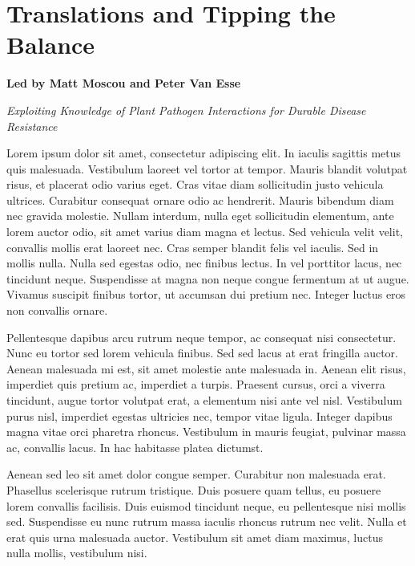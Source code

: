 \documentclass[12pt,]{book}
\theoremstyle{definition}
\theoremstyle{definition}
\theoremstyle{remark}
\begin{document}
\chapter*{Translations and Tipping the
Balance}\label{translations-and-tipping-the-balance}

\textbf{Led by Matt Moscou and Peter Van Esse}

\emph{Exploiting Knowledge of Plant Pathogen Interactions for Durable
Disease Resistance}

Lorem ipsum dolor sit amet, consectetur adipiscing elit. In iaculis
sagittis metus quis malesuada. Vestibulum laoreet vel tortor at tempor.
Mauris blandit volutpat risus, et placerat odio varius eget. Cras vitae
diam sollicitudin justo vehicula ultrices. Curabitur consequat ornare
odio ac hendrerit. Mauris bibendum diam nec gravida molestie. Nullam
interdum, nulla eget sollicitudin elementum, ante lorem auctor odio, sit
amet varius diam magna et lectus. Sed vehicula velit velit, convallis
mollis erat laoreet nec. Cras semper blandit felis vel iaculis. Sed in
mollis nulla. Nulla sed egestas odio, nec finibus lectus. In vel
porttitor lacus, nec tincidunt neque. Suspendisse at magna non neque
congue fermentum at ut augue. Vivamus suscipit finibus tortor, ut
accumsan dui pretium nec. Integer luctus eros non convallis ornare.

Pellentesque dapibus arcu rutrum neque tempor, ac consequat nisi
consectetur. Nunc eu tortor sed lorem vehicula finibus. Sed sed lacus at
erat fringilla auctor. Aenean malesuada mi est, sit amet molestie ante
malesuada in. Aenean elit risus, imperdiet quis pretium ac, imperdiet a
turpis. Praesent cursus, orci a viverra tincidunt, augue tortor volutpat
erat, a elementum nisi ante vel nisl. Vestibulum purus nisl, imperdiet
egestas ultricies nec, tempor vitae ligula. Integer dapibus magna vitae
orci pharetra rhoncus. Vestibulum in mauris feugiat, pulvinar massa ac,
convallis lacus. In hac habitasse platea dictumst.

Aenean sed leo sit amet dolor congue semper. Curabitur non malesuada
erat. Phasellus scelerisque rutrum tristique. Duis posuere quam tellus,
eu posuere lorem convallis facilisis. Duis euismod tincidunt neque, eu
pellentesque nisi mollis sed. Suspendisse eu nunc rutrum massa iaculis
rhoncus rutrum nec velit. Nulla et erat quis urna malesuada auctor.
Vestibulum sit amet diam maximus, luctus nulla mollis, vestibulum nisi.
\end{document}
